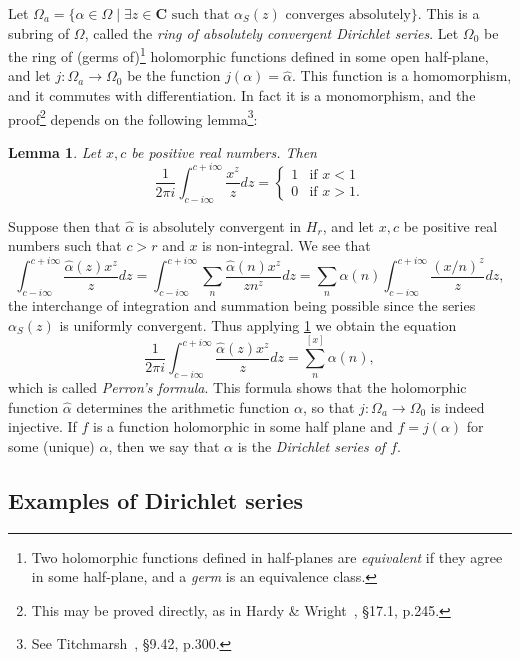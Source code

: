 \documentclass[10pt]{article}
\newtheorem{lemm}[theo]{Lemma}
\theoremstyle{definition}
\def\CC{\mathbf{C}}
\def\fnfi{Two holomorphic functions defined in half-planes are \emph{equivalent} if they agree in some half-plane, and a \emph{germ} is an equivalence class.}
\def\fnsi{This may be proved directly, as in Hardy \& Wright~\cite{bib:86}, \S17.1, p.245.}
\def\fnse{See Titchmarsh~\cite{bib:194}, \S9.42, p.300.}
\begin{document}
Let $\Omega_a = \{ \alpha \in \Omega \mid \text{$\exists z \in \CC$ such that $\alpha_S(z)$ converges absolutely} \}$.
This is a subring of $\Omega$, called the \emph{ring of absolutely convergent Dirichlet series}.
Let $\Omega_0$ be the ring of (germs of)\footnote{\fnfi} holomorphic functions defined in some open half-plane, and let $j : \Omega_a \to \Omega_0$ be the function $j(\alpha) = \widehat\alpha$.
This function is a homomorphism, and it commutes with differentiation.
In fact it is a monomorphism, and the proof\footnote{\fnsi} depends on the following lemma\footnote{\fnse}:


\begin{lemm}
\label{1.2.1}
Let $x,c$ be positive real numbers.
Then
\[
\frac{1}{2\pi i} \int_{c - i \infty}^{c + i\infty} \frac{x^z}{z} dz
= \begin{cases}
1 & \text{if $x < 1$}
\\
0 & \text{if $x > 1$}.
\end{cases}
\]
\end{lemm}


Suppose then that $\widehat\alpha$ is absolutely convergent in $H_r$, and let $x,c$ be positive real numbers such that $c > r$ and $x$ is non-integral.
We see that
\[
\int_{c - i\infty}^{c + i\infty} \frac{\widehat\alpha(z) x^z}{z} dz
= \int_{c - i\infty}^{c + i\infty} \sum_n \frac{\widehat\alpha(n) x^z}{z n^z} dz
= \sum_n \alpha(n) \int_{c - i\infty}^{c + i\infty} \frac{(x/n)^z}{z} dz,
\]
the interchange of integration and summation being possible since the series $\alpha_S(z)$ is uniformly convergent.
Thus applying \ref{1.2.1} we obtain the equation
\[
\frac{1}{2\pi i} 
\int_{c-i\infty}^{c+i\infty} \frac{\widehat\alpha(z) x^z}{z} dz
= \sum_n^{[x]} \alpha(n),
\]
which is called \emph{Perron's formula}.
This formula shows that the holomorphic function $\widehat\alpha$ determines the arithmetic function $\alpha$, so that $j : \Omega_a \to \Omega_0$ is indeed injective.
If $f$ is a function holomorphic in some half plane and $f = j(\alpha)$ for some (unique) $\alpha$, then we say that $\alpha$ is the \emph{Dirichlet series of $f$}.


\subsection{Examples of Dirichlet series}
\label{ch:1.3}
\end{document}
